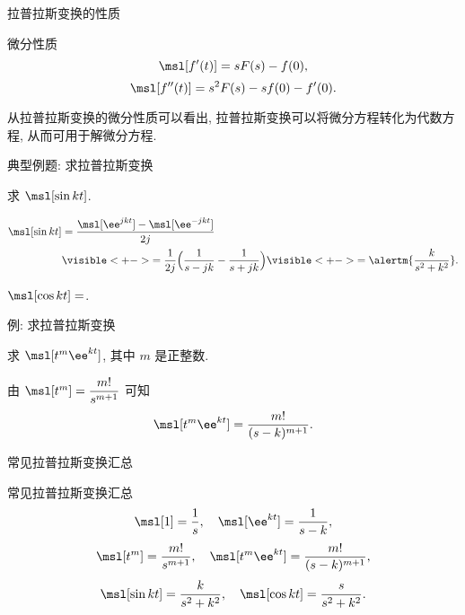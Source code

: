 \begin{frame}{拉普拉斯变换的性质}
	\onslide<+->
	\begin{algorithm}{微分性质}
	\[
		\msl[f'(t)]=sF(s)-f(0),
	\]
	\[
		\msl[f''(t)]=s^2F(s)-sf(0)-f'(0).
	\]
	\end{algorithm}

	\onslide<+->
	从拉普拉斯变换的微分性质可以看出, 拉普拉斯变换可以将微分方程转化为代数方程, 从而可用于解微分方程.
\end{frame}


\begin{frame}{典型例题: 求拉普拉斯变换}
	\onslide<+->
	\begin{example}
		求 $\msl[\sin{kt}]$.
	\end{example}

	\onslide<+->
	\begin{solution}
		\begin{align*}
			\msl[\sin{kt}]&=\frac{\msl[\ee^{jkt}]-\msl[\ee^{-jkt}]}{2j}\\
			&\visible<+->{=\frac1{2j}\Bigl(\frac1{s-jk}-\frac1{s+jk}\Bigr)}
			\visible<+->{=\alertm{\frac k{s^2+k^2}}.}
		\end{align*}
	\end{solution}

	\onslide<+->
	\begin{exercise}
		$\msl[\cos{kt}]=$.
	\end{exercise}
\end{frame}


\begin{frame}{例: 求拉普拉斯变换}
	\onslide<+->
	\begin{example}
		求 $\msl[t^m\ee^{kt}]$, 其中 $m$ 是正整数.
	\end{example}

	\onslide<+->
	\begin{solution}
		由 $\msl[t^m]=\dfrac{m!}{s^{m+1}}$ 可知
	\[
		\msl[t^m\ee^{kt}]=\frac{m!}{(s-k)^{m+1}}.
	\]
	\end{solution}
\end{frame}


\begin{frame}{常见拉普拉斯变换汇总}
	\onslide<+->
	\begin{algorithm}{常见拉普拉斯变换汇总}
	\[
		\msl[1]=\frac1s,\quad \msl[\ee^{kt}]=\frac1{s-k},
	\]
	\[
		\msl[t^m]=\frac{m!}{s^{m+1}},\quad \msl[t^m\ee^{kt}]=\frac{m!}{(s-k)^{m+1}},
	\]
	\[
		\msl[\sin kt]=\frac{k}{s^2+k^2},\quad
		\msl[\cos kt]=\frac{s}{s^2+k^2}.
	\]
	\end{algorithm}
\end{frame}


